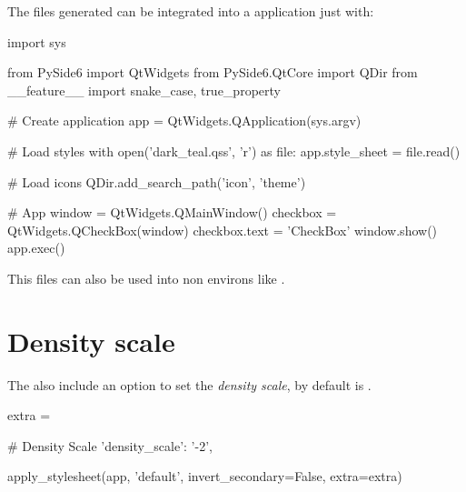 The files generated can be integrated into a  application just with:
\begin{python}
import sys

from PySide6 import QtWidgets
from PySide6.QtCore import QDir
from __feature__ import snake_case, true_property

# Create application
app = QtWidgets.QApplication(sys.argv)

# Load styles
with open('dark_teal.qss', 'r') as file:
    app.style_sheet = file.read()

# Load icons
QDir.add_search_path('icon', 'theme')

# App
window = QtWidgets.QMainWindow()
checkbox = QtWidgets.QCheckBox(window)
checkbox.text = 'CheckBox'
window.show()
app.exec()
\end{python}
This files can also be used into non  environs like .

\section{Density scale}
The  also include an option to set the \textit{density scale}, by default is .
\begin{python}
extra = {
    
    # Density Scale
    'density_scale': '-2',
}

apply_stylesheet(app, 'default', invert_secondary=False, extra=extra)
\end{python}
